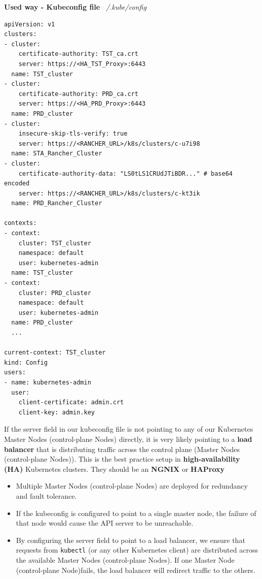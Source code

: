 \documentclass{article}
\newenvironment{blocktemplateII}[1]{%
    \tcolorbox[beamer,%
    noparskip,breakable,
    colframe=Green,%
    colbacklower=LimeGreen!75!LightGreen,%
    title=#1]}%
    {\endtcolorbox}
\newenvironment{codetemplate}[1][]{%
  \mybasecolorbox[#1]
  \itshape
}{%
  \endmybasecolorbox
}
\begin{document}
\textbf{Used way - Kubeconfig file}
\begin{codetemplate}{~/.kube/config}
\begin{verbatim}
apiVersion: v1
clusters:
- cluster:
    certificate-authority: TST_ca.crt
    server: https://<HA_TST_Proxy>:6443
  name: TST_cluster
- cluster:
    certificate-authority: PRD_ca.crt
    server: https://<HA_PRD_Proxy>:6443
  name: PRD_cluster
- cluster:
    insecure-skip-tls-verify: true
    server: https://<RANCHER_URL>/k8s/clusters/c-u7i98
  name: STA_Rancher_Cluster
- cluster:
    certificate-authority-data: "LS0tLS1CRUdJTiBDR..." # base64 encoded
    server: https://<RANCHER_URL>/k8s/clusters/c-kt3ik
  name: PRD_Rancher_Cluster

contexts:
- context:
    cluster: TST_cluster
    namespace: default
    user: kubernetes-admin
  name: TST_cluster
- context:
    cluster: PRD_cluster
    namespace: default
    user: kubernetes-admin
  name: PRD_cluster
  ...

current-context: TST_cluster
kind: Config
users:
- name: kubernetes-admin
  user:
    client-certificate: admin.crt
    client-key: admin.key
\end{verbatim}
\end{codetemplate}

\begin{blocktemplateII}{NOTE}
If the server field in our kubeconfig file is not pointing to any of our Kubernetes Master Nodes (control-plane Nodes) directly, it is very likely pointing to a \textbf{load balancer}
that is distributing traffic across the control plane (Master Nodes (control-plane Nodes)). 
This is the best practice setup in \textbf{high-availability (HA)} Kubernetes clusters. They should be an \textbf{NGNIX} or \textbf{HAProxy}
\begin{itemize}
    \item Multiple Master Nodes (control-plane Nodes) are deployed for redundancy and fault tolerance.
    \item If the kubeconfig is configured to point to a single master node, the failure of that node would cause the API server to be unreachable.
    \item By configuring the server field to point to a load balancer, we ensure that requests from \verb|kubectl| (or any other Kubernetes client) are distributed across the available Master Nodes (control-plane Nodes). If one Master Node (control-plane Node)fails, the load balancer will redirect traffic to the others.
\end{itemize}
\end{blocktemplateII}
\end{document}
